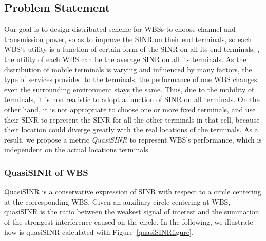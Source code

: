 \subsection{Problem Statement}
Our goal is to design distributed scheme for WBSs to choose channel and transmission power, so as to improve the SINR on their end terminals, so each WBS's utility is a function of certain form of the SINR on all its end terminals, \ie, the utility of each WBS can be the average SINR on all its terminals.
As the distribution of mobile terminals is varying and influenced by many factors, \ie the type of services provided to the terminals, the performance of one WBS changes even the surrounding environment stays the same.
Thus, due to the mobility of terminals, it is non realistic to adopt a function of SINR on all terminals.
%
On the other hand, it is not appropriate to choose one or more fixed terminals, and use their SINR to represent the SINR for all the other terminals in that cell, because their location could diverge greatly with the real locations of the terminals.
As a result, we propose a metric \textit{QuasiSINR} to represent WBS's performance, which is independent on the actual locations terminals.



\subsubsection*{QuasiSINR of WBS}

QuasiSINR is a conservative expression of SINR with respect to a circle centering at the corresponding WBS.
Given an auxiliary circle centering at WBS, quasiSINR is the ratio between the weakest signal of interest and the summation of the strongest interference caused on the circle.
In the following, we illustrate how is quasiSINR calculated with Figure~\ref{quasiSINRfigure}.

